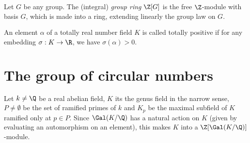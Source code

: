 \iffalse
\begin{lemma}\label{comp}
We have $kK_iK_jK_l=K$ and $K_1K_2K_3K_4=K$.
\end{lemma}
\begin{proof}
The extension $K/K_iK_jK_l$ is totally ramified at the prime ideals above $p_h$, so the same must be true for the extension $K/kK_iK_jK_l$. But since the extension $K/k$ is unramified (by the definition of $K$), so is $K/kK_iK_jK_l$. Therefore $[K:kK_iK_jK_l]=1$. The second claim follows from the facts %
$T_i=\Gal(K/K_jK_lK_h)$ and $G=T_1\times T_2\times T_3\times T_4$.
\end{proof}
\begin{center}
\begin{tikzpicture}
  \node (a) at (0,4)  {$K$};
  \node (b) at (0,2)  {$kK_iK_jK_l$};
  \node (c) at (-3,1)  {$k$};
  \node (d) at (3,1)  {$K_iK_jK_l$};
  \draw[transform canvas={xshift=-1.5pt}] (a) -- (b);
  \draw[transform canvas={xshift=1.5pt}] (b) -- (a);
  \draw   (b) --  (c)
   (b) -- (d);
  \draw[bend left](c) to node [above , sloped]{\text{unramified}}(a);
  \draw[bend right](d) to node [above , sloped]{\text{totally ramified above $p_h$}}(a);
\end{tikzpicture}
\end{center}
\fi


\begin{definition}
Let $G$ be any group. The (integral) \textit{group ring} $\Z[G]$ is the free $\Z$-module with basis $G$, which is made into a ring, extending linearly the group law on $G$.
\end{definition}

\begin{definition}
An element $\alpha$ of a totally real number field $K$ is called totally positive if for any embedding $\sigma: K\to \R$, we have $\sigma(\alpha)>0$.
\end{definition}

\section{The group of circular numbers}
Let $k\neq \Q$ be a real abelian field, $K$ its the genus field in the narrow sense, $P\neq \emptyset$ be the set of ramified primes of $k$ and $K_p$ be the maximal subfield of $K$ ramified only at $p\in P$. Since $\Gal(K/\Q)$ has a natural action on $K$ (given by evaluating an automorphism on an element), this makes $K$ into a $\Z[\Gal(K/\Q)]$-module. 

